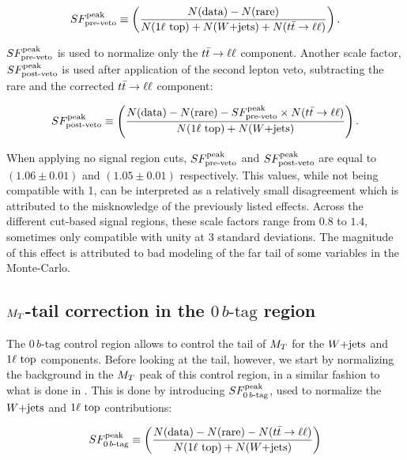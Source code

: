     \begin{equation}
        SF_{\text{pre-veto}}^{\text{peak}}
        \equiv
        \left(
            \frac{N(\text{data}) - N(\text{rare})}
                 {N(1\ell~\text{top}) + N(\text{$W$+jets}) + N(t\bar{t} \rightarrow \ell \ell)}
        \right).
        \label{eq:SFpreDefinition}
    \end{equation}

    $SF_{\text{pre-veto}}^{\text{peak}}$ is used to normalize only the $t\bar{t} \rightarrow \ell \ell$ component. Another scale factor,
    $SF_{\text{post-veto}}^{\text{peak}}$ is used after application of the second lepton veto, subtracting the rare
    and the corrected $t\bar{t} \rightarrow \ell \ell$ component:

    \begin{equation}
        SF_{\text{post-veto}}^{\text{peak}}
        \equiv
        \left(
            \frac{N(\text{data}) - N(\text{rare}) - SF_{\text{pre-veto}}^{\text{peak}} \times N(t\bar{t} \rightarrow \ell \ell)}
                 {N(1\ell~\text{top}) + N(\text{$W$+jets})}
        \right).
        \label{eq:SFpostDefinition}
    \end{equation}

     When applying no signal region cuts, $SF_{\text{pre-veto}}^{\text{peak}}$ and $SF_{\text{post-veto}}^{\text{peak}}$ are equal to
     $(1.06 \pm 0.01)$ and $(1.05 \pm 0.01)$ respectively. This values, while not
     being compatible with 1, can be interpreted as a relatively small disagreement
     which is attributed to the misknowledge of the previously listed effects. Across the
     different cut-based signal regions, these scale factors range from $0.8$ to $1.4$,
     sometimes only compatible with unity at 3 standard deviations. The magnitude of this
     effect is attributed to bad modeling of the far tail of some variables in the
     Monte-Carlo.

        \subsection{$M_T$-tail correction in the $0\, b\text{-tag}$ region \label{sec:MTtailCorrection}}

    The $0\, b\text{-tag}$ control region allows to control the tail of $M_T$ for the $\text{$W$+jets}$ and
    $1\ell~\text{top}$ components. Before looking at the tail, however, we start by normalizing
    the background in the $M_T$ peak of this control region, in a similar fashion to what
    is done in . This is done by introducing $SF_{0\, b\text{-tag}}^{\text{peak}}$,
    used to normalize the $\text{$W$+jets}$ and $1\ell~\text{top}$ contributions:

    \begin{equation}
        SF_{0\, b\text{-tag}}^{\text{peak}}
        \equiv
        \left(
            \frac{N(\text{data}) - N(\text{rare}) - N(t\bar{t} \rightarrow \ell \ell)}
                 {N(1\ell~\text{top}) + N(\text{$W$+jets})}
        \right)
        \label{eq:SF0btagDefinition}
    \end{equation}

